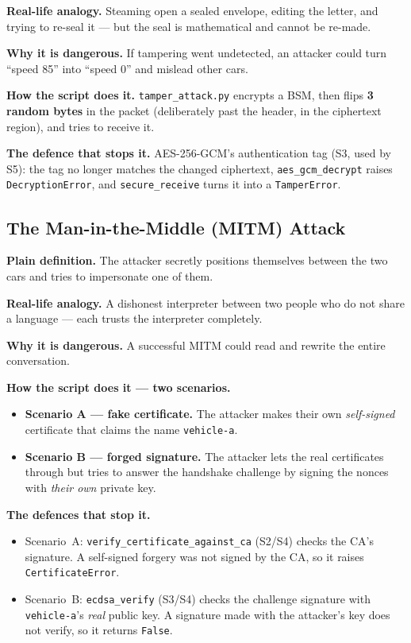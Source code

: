 \documentclass[11pt,a4paper]{article}
\begin{document}
\textbf{Real-life analogy.} Steaming open a sealed envelope, editing the letter,
and trying to re-seal it --- but the seal is mathematical and cannot be re-made.

\textbf{Why it is dangerous.} If tampering went undetected, an attacker could
turn ``speed 85'' into ``speed 0'' and mislead other cars.

\textbf{How the script does it.} \texttt{tamper\_attack.py} encrypts a BSM, then
flips \textbf{3 random bytes} in the packet (deliberately past the header, in the
ciphertext region), and tries to receive it.

\textbf{The defence that stops it.} AES-256-GCM's authentication tag (S3, used by
S5): the tag no longer matches the changed ciphertext, \texttt{aes\_gcm\_decrypt}
raises \texttt{DecryptionError}, and \texttt{secure\_receive} turns it into a
\texttt{TamperError}.

\subsection{The Man-in-the-Middle (MITM) Attack}
\textbf{Plain definition.} The attacker secretly positions themselves between the
two cars and tries to impersonate one of them.

\textbf{Real-life analogy.} A dishonest interpreter between two people who do not
share a language --- each trusts the interpreter completely.

\textbf{Why it is dangerous.} A successful MITM could read and rewrite the entire
conversation.

\textbf{How the script does it --- two scenarios.}
\begin{itemize}
  \item \textbf{Scenario A --- fake certificate.} The attacker makes their own
        \emph{self-signed} certificate that claims the name \texttt{vehicle-a}.
  \item \textbf{Scenario B --- forged signature.} The attacker lets the real
        certificates through but tries to answer the handshake challenge by
        signing the nonces with \emph{their own} private key.
\end{itemize}

\textbf{The defences that stop it.}
\begin{itemize}
  \item Scenario~A: \texttt{verify\_certificate\_against\_ca} (S2/S4) checks the
        CA's signature. A self-signed forgery was not signed by the CA, so it
        raises \texttt{CertificateError}.
  \item Scenario~B: \texttt{ecdsa\_verify} (S3/S4) checks the challenge signature
        with \texttt{vehicle-a}'s \emph{real} public key. A signature made with
        the attacker's key does not verify, so it returns \texttt{False}.
\end{itemize}
\end{document}

